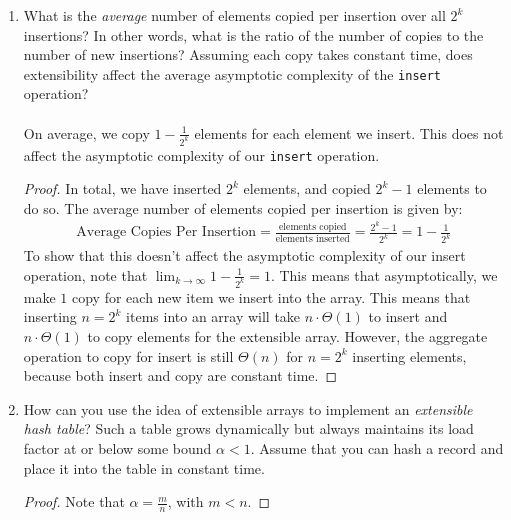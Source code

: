 \documentclass[11pt]{article}
\begin{document}
\begin{enumerate}
\begin{enumerate}
\item
What is the \emph{average} number of elements copied per
insertion over all $2^k$ insertions?  In other words,
what is the ratio of the number of copies to the number of new
insertions?  Assuming each copy takes constant time, does 
extensibility affect the average asymptotic complexity of the 
\texttt{insert} operation?
\\ \\
On average, we copy $1-\frac{1}{2^k}$ elements for each element we insert.  This does not affect the asymptotic complexity of our \texttt{insert} operation.
\begin{proof}
In total, we have inserted $2^k$ elements, and copied $2^k-1$ elements to do so.  The average number of elements copied per insertion is given by:
\begin{align*}
\text{Average Copies Per Insertion} = \frac{\text{elements copied}}{\text{elements inserted}}=\frac{2^k-1}{2^k}= 1-\frac{1}{2^k}
\end{align*}
To show that this doesn't affect the asymptotic complexity of our insert operation, note that $\lim_{k \to \infty} 1-\frac{1}{2^k} = 1$.  This means that asymptotically, we make $1$ copy for each new item we insert into the array.  This means that inserting $n=2^k$ items into an array will take $n \cdot \Theta(1)$ to insert and $n \cdot \Theta(1)$ to copy elements for the extensible array.  However, the aggregate operation to copy for insert is still $\Theta(n)$ for $n= 2^k$ inserting elements, because both insert and copy are constant time.   
\end{proof}
\item
How can you use the idea of extensible arrays to implement an
\emph{extensible hash table}?  Such a table grows dynamically but
always maintains its load factor at or below some bound $\alpha < 1$.
Assume that you can hash a record and place it into the table in
constant time.
\begin{proof}
Note that $\alpha = \frac{m}{n}$, with $m<n$.
\end{proof}
\end{enumerate}
\end{enumerate}
\end{document}
